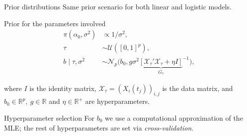 \documentclass[9pt, english, professionalfonts]{beamer}
\newcommand{\R} {\ensuremath{\mathds{R}}}
\begin{document}
\begin{frame}{Prior distributions}
  Same prior scenario for both linear and logistic models.
  \vspace{.5em}
  \begin{block}{Prior for the parameters involved}
    \vspace{-1em}
  \begin{align*}
  \pi(\alpha_0, \sigma^2)              & \propto 1/\sigma^2,                                                     \\
  \tau                     & \sim \mathcal U([0, 1]^p),                                              \\
  b\mid \tau, \sigma^2 & \sim \mathcal N_p\big(b_0, g\sigma^2{\underbrace{\left[\mathcal X_\tau' \mathcal X_\tau + \eta I\right]}_{G_\tau}}^{-1}\big),
\end{align*}

\vspace{-1em}
where \(I\) is the identity matrix, \(\mathcal X_\tau = (X_i(t_j))_{i,j}\) is the data matrix, and \(b_0\in \R^p, \ g \in \R\) and \(\eta \in \R^+\) are hyperparameters.
\end{block}


\vspace{1em}
\begin{alertblock}{Hyperparameter selection}
  \vspace{0.25em}
  For \(b_0\) we use a computational approximation of the MLE; the rest of hyperparameters are set via \textit{cross-validation}.
\end{alertblock}
\end{frame}
\end{document}

